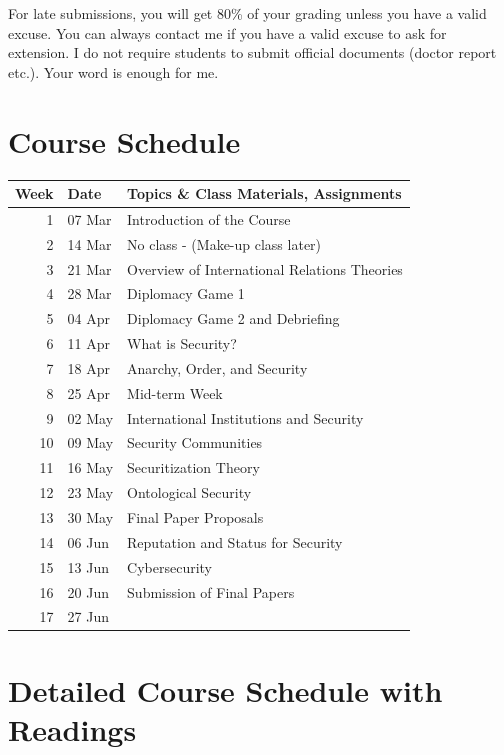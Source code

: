 \documentclass[
  letterpaper,
  DIV=11,
  numbers=noendperiod]{scrartcl}
\begin{document}
For late submissions, you will get 80\% of your grading unless you have
a valid excuse. You can always contact me if you have a valid excuse to
ask for extension. I do not require students to submit official
documents (doctor report etc.). Your word is enough for me.

\newpage{}

\hypertarget{course-schedule}{%
\section{\texorpdfstring{{Course
Schedule}}{Course Schedule}}\label{course-schedule}}

\begin{longtable}{rll}
\toprule
Week & Date & Topics \& Class Materials, Assignments \\ 
\midrule
1 & 07 Mar & Introduction of the Course \\ 
2 & 14 Mar & No class - (Make-up class later) \\ 
3 & 21 Mar & Overview of International Relations Theories \\ 
4 & 28 Mar & Diplomacy Game 1 \\ 
5 & 04 Apr & Diplomacy Game 2 and Debriefing \\ 
6 & 11 Apr & What is Security? \\ 
7 & 18 Apr & Anarchy, Order, and Security \\ 
8 & 25 Apr & Mid-term Week \\ 
9 & 02 May & International Institutions and Security \\ 
10 & 09 May & Security Communities \\ 
11 & 16 May & Securitization Theory \\ 
12 & 23 May & Ontological Security \\ 
13 & 30 May & Final Paper Proposals \\ 
14 & 06 Jun & Reputation and Status for Security \\ 
15 & 13 Jun & Cybersecurity \\ 
16 & 20 Jun & Submission of Final Papers \\ 
17 & 27 Jun &  \\ 
\bottomrule
\end{longtable}

\newpage{}

\hypertarget{detailed-course-schedule-with-readings}{%
\section{\texorpdfstring{{Detailed Course Schedule with
Readings}}{Detailed Course Schedule with Readings}}\label{detailed-course-schedule-with-readings}}
\end{document}
